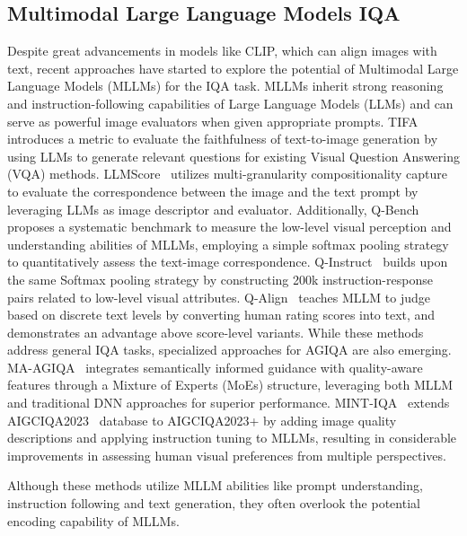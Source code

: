 \subsection{Multimodal Large Language Models IQA}
Despite great advancements in models like CLIP, which can align images with text, recent approaches have started to explore the potential of Multimodal Large Language Models (MLLMs) for the IQA task.
MLLMs inherit strong reasoning and instruction-following capabilities of Large Language Models (LLMs) and can serve as powerful image evaluators when given appropriate prompts.
TIFA~\cite{hu2023tifa} introduces a metric to evaluate the faithfulness of text-to-image generation by using LLMs to generate relevant questions for existing Visual Question Answering (VQA) methods.
LLMScore~\cite{lu2024llmscore} utilizes multi-granularity compositionality capture to evaluate the correspondence between the image and the text prompt by leveraging LLMs as image descriptor and evaluator.
Additionally, Q-Bench~\cite{wu2023q} proposes a systematic benchmark to measure the low-level visual perception and understanding abilities of MLLMs, employing a simple softmax pooling strategy to quantitatively assess the text-image correspondence.
Q-Instruct~\cite{wu2024q} builds upon the same Softmax pooling strategy by constructing 200k instruction-response pairs related to low-level visual attributes.
Q-Align~\cite{wu2023qalign} teaches MLLM to judge based on discrete text levels by converting human rating scores into text, and demonstrates an advantage above score-level variants.
While these methods address general IQA tasks, specialized approaches for AGIQA are also emerging.
MA-AGIQA~\cite{wang2024large} integrates semantically informed guidance with quality-aware features through a Mixture of Experts (MoEs) structure, leveraging both MLLM and traditional DNN approaches for superior performance.
MINT-IQA~\cite{wang2024understanding} extends AIGCIQA2023~\cite{wang2023aigciqa2023} database to AIGCIQA2023+ by adding image quality descriptions and applying instruction tuning to MLLMs, resulting in considerable improvements in assessing human visual preferences from multiple perspectives.

Although these methods utilize MLLM abilities like prompt understanding, instruction following and text generation, they often overlook the potential encoding capability of MLLMs.

